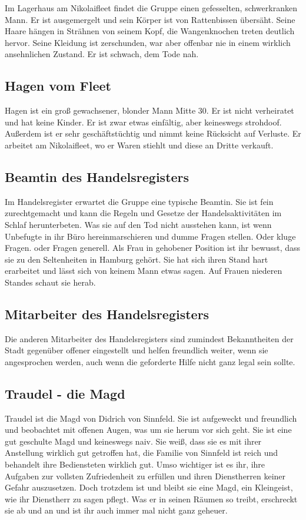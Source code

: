 Im Lagerhaus am Nikolaifleet findet die Gruppe einen gefesselten, schwerkranken Mann. Er ist ausgemergelt und sein Körper ist von Rattenbissen übersäht. Seine Haare hängen in Strähnen von seinem Kopf, die Wangenknochen treten deutlich hervor. Seine Kleidung ist zerschunden, war aber offenbar nie in einem wirklich ansehnlichen Zustand. Er ist schwach, dem Tode nah.

\subsection{Hagen vom Fleet}

Hagen ist ein groß gewachsener, blonder Mann Mitte 30. Er ist nicht verheiratet und hat keine Kinder. Er ist zwar etwas einfältig, aber keineswegs strohdoof. Außerdem ist er sehr geschäftstüchtig und nimmt keine Rücksicht auf Verluste. Er arbeitet am Nikolaifleet, wo er Waren stiehlt und diese an Dritte verkauft.

\subsection{Beamtin des Handelsregisters}

Im Handelsregister erwartet die Gruppe eine typische Beamtin. Sie ist fein zurechtgemacht und kann die Regeln und Gesetze der Handelsaktivitäten im Schlaf herunterbeten. Was sie auf den Tod nicht ausstehen kann, ist wenn Unbefugte in ihr Büro hereinmarschieren und dumme Fragen stellen. Oder kluge Fragen. oder Fragen generell. Als Frau in gehobener Position ist ihr bewusst, dass sie zu den Seltenheiten in Hamburg gehört. Sie hat sich ihren Stand hart erarbeitet und lässt sich von keinem Mann etwas sagen. Auf Frauen niederen Standes schaut sie herab.

\subsection{Mitarbeiter des Handelsregisters}

Die anderen Mitarbeiter des Handelsregisters sind zumindest Bekanntheiten der Stadt gegenüber offener eingestellt und helfen freundlich weiter, wenn sie angesprochen werden, auch wenn die geforderte Hilfe nicht ganz legal sein sollte.

\subsection{Traudel - die Magd}

Traudel ist die Magd von Didrich von Sinnfeld. Sie ist aufgeweckt und freundlich und beobachtet mit offenen Augen, was um sie herum vor sich geht. Sie ist eine gut geschulte Magd und keineswegs naiv. Sie weiß, dass sie es mit ihrer Anstellung wirklich gut getroffen hat, die Familie von Sinnfeld ist reich und behandelt ihre Bediensteten wirklich gut. Umso wichtiger ist es ihr, ihre Aufgaben zur vollsten Zufriedenheit zu erfüllen und ihren Dienstherren keiner Gefahr auszusetzen. Doch trotzdem ist und bleibt sie eine Magd, ein Kleingeist, wie ihr Dienstherr zu sagen pflegt. Was er in seinen Räumen so treibt, erschreckt sie ab und an und ist ihr auch immer mal nicht ganz geheuer.

